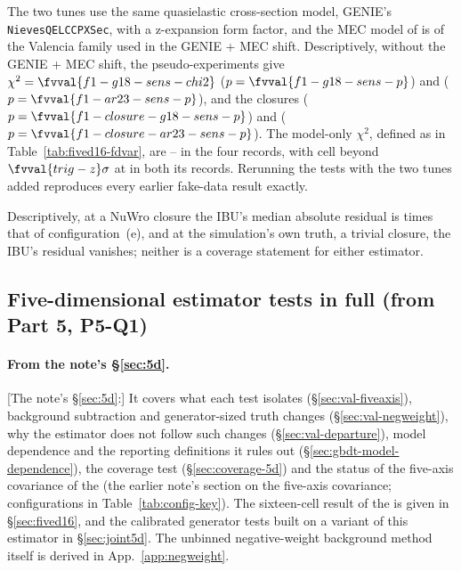 The two tunes use the same quasielastic cross-section model, GENIE's \texttt{NievesQELCCPXSec},  with a z-expansion form factor, and the MEC model of  is of the Valencia family used in the GENIE + MEC shift. Descriptively, without the GENIE + MEC shift, the pseudo-experiments give $\chi^2=\fvval{f1-g18-sens-chi2}$ ($p=\fvval{f1-g18-sens-p}$) and  ($p=\fvval{f1-ar23-sens-p}$), and the closures  ($p=\fvval{f1-closure-g18-sens-p}$) and  ($p=\fvval{f1-closure-ar23-sens-p}$). The model-only $\chi^2$, defined as in Table~\ref{tab:fived16-fdvar}, are -- in the four records, with cell  beyond $\fvval{trig-z}\sigma$ at  in both its records. Rerunning the tests with the two tunes added reproduces every earlier fake-data result exactly.

Descriptively, at a NuWro closure the IBU's median absolute residual is  times that of configuration~(e), and at the simulation's own truth, a trivial closure, the IBU's residual vanishes; neither is a coverage statement for either estimator.

\subsection{Five-dimensional estimator tests in full (from Part 5, P5-Q1)}

\paragraph{From the note's \S\ref{sec:5d}.}
[The note's \S\ref{sec:5d}:] It covers what each test isolates (\S\ref{sec:val-fiveaxis}), background subtraction and generator-sized truth changes (\S\ref{sec:val-negweight}), why the estimator does not follow such changes (\S\ref{sec:val-departure}), model dependence and the reporting definitions it rules out (\S\ref{sec:gbdt-model-dependence}), the coverage test (\S\ref{sec:coverage-5d}) and the status of the five-axis covariance of the \resFiveAxis{} (the earlier note's section on the five-axis covariance; configurations in Table~\ref{tab:config-key}). The sixteen-cell result of the \estMultiD{} is given in \S\ref{sec:fived16}, and the calibrated generator tests built on a variant of this estimator in \S\ref{sec:joint5d}. The unbinned negative-weight background method itself is derived in App.~\ref{app:negweight}.

